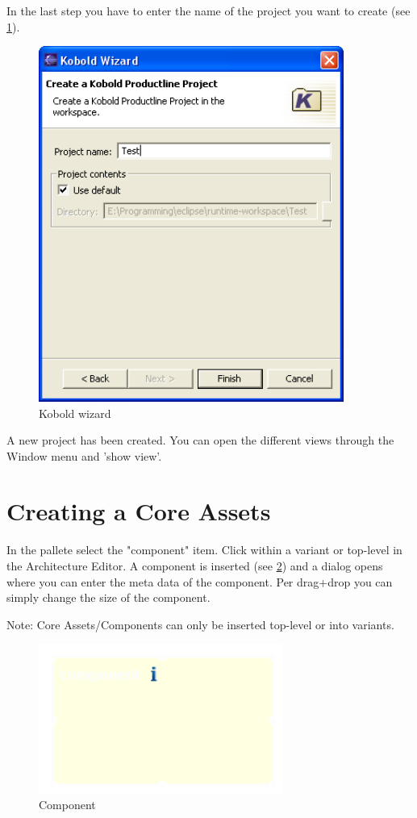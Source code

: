 In the last step you have to enter the name of the project you want to create (see \ref{wizard3}).

\begin{figure}[h!]
\begin{center}
\includegraphics[width=10cm]{wizard3.png}
   \caption{Kobold wizard}
\label{wizard3}
\end{center}
\end{figure}\par

A new project has been created. You can open the different views through the Window menu
and 'show view'. 

\section{Creating a Core Assets}

In the pallete select the "component" item. Click within a variant or top-level in 
the Architecture Editor. A component is inserted (see \ref{component}) and a dialog opens where you can enter the meta data of
the component. Per drag+drop you can simply change the size of the component. \par
Note: Core Assets/Components can only be inserted top-level or into variants.

\begin{figure}[h!]
\begin{center}
\includegraphics[width=8cm]{component.png}
   \caption{Component}
\label{component}
\end{center}
\end{figure}\par


